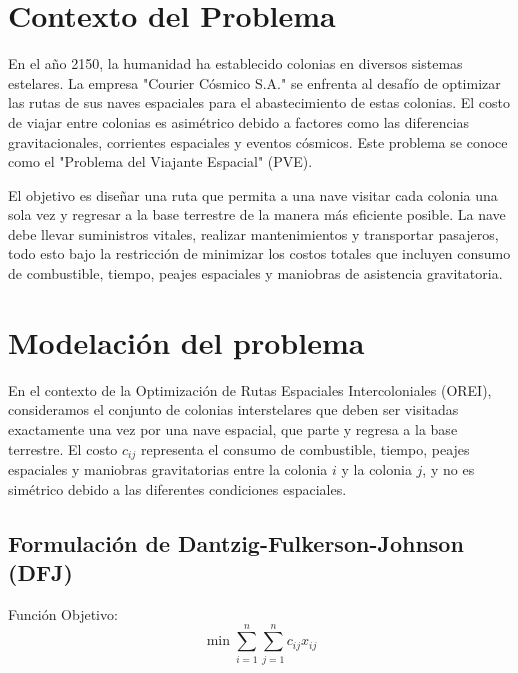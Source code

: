 \documentclass[
	spanish, %
	oneside
]{article}
\begin{document}
\templateFinalcfg


\section{Contexto del Problema}

En el año 2150, la humanidad ha establecido colonias en diversos sistemas estelares. La empresa "Courier Cósmico S.A." se enfrenta al desafío de optimizar las rutas de sus naves espaciales para el abastecimiento de estas colonias. El costo de viajar entre colonias es asimétrico debido a factores como las diferencias gravitacionales, corrientes espaciales y eventos cósmicos. Este problema se conoce como el "Problema del Viajante Espacial" (PVE).
\vspace{12pt}

\noindent El objetivo es diseñar una ruta que permita a una nave visitar cada colonia una sola vez y regresar a la base terrestre de la manera más eficiente posible. La nave debe llevar suministros vitales, realizar mantenimientos y transportar pasajeros, todo esto bajo la restricción de minimizar los costos totales que incluyen consumo de combustible, tiempo, peajes espaciales y maniobras de asistencia gravitatoria.
\vspace{12pt}



\newpage

\section*{Modelación del problema}

En el contexto de la Optimización de Rutas Espaciales Intercoloniales (OREI), consideramos el conjunto de colonias interstelares que deben ser visitadas exactamente una vez por una nave espacial, que parte y regresa a la base terrestre. El costo \( c_{ij} \) representa el consumo de combustible, tiempo, peajes espaciales y maniobras gravitatorias entre la colonia \( i \) y la colonia \( j \), y no es simétrico debido a las diferentes condiciones espaciales.

\subsection*{Formulación de Dantzig-Fulkerson-Johnson (DFJ)}

Función Objetivo:
\begin{equation}
    \min \sum_{i=1}^{n}\sum_{j=1}^{n} c_{ij} x_{ij}
\end{equation}
\end{document}
